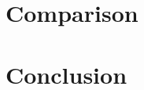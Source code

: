 \documentclass[a4paper, oneside]{csthesis}
\begin{document}
\chapter{Comparison}


\chapter{Conclusion}
	






	
\end{document}
